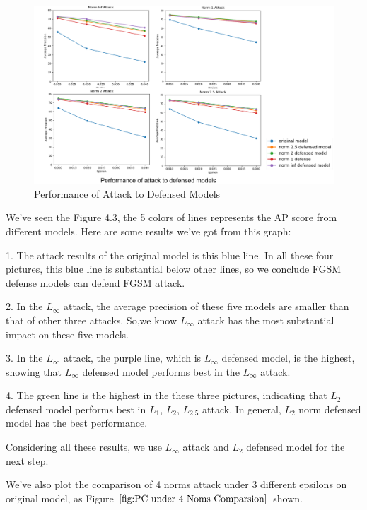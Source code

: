 \begin{figure}[!htbp]
\centering
\includegraphics[scale=0.6]{Graphics/Defense Models Attack.png}
\caption{Performance of Attack to Defensed Models}
\label{fig:Defensed Models}
\end{figure}

We've seen the Figure 4.3, the 5 colors of lines represents the AP score from different models. Here are some results we've got from this graph:

1. The attack results of the original model is this blue line. In all these four pictures, this blue line is substantial below other lines, so we conclude FGSM defense models can defend FGSM attack.

2. In the \(L_{\infty}\) attack, the average precision of these five models are smaller than that of other three attacks. So,we know \(L_{\infty}\) attack has the most substantial impact on these five models.

3. In the \(L_{\infty}\) attack, the purple line, which is \(L_{\infty}\) defensed model, is the highest, showing that \(L_{\infty}\) defensed model performs best in the \(L_{\infty}\) attack.

4. The green line is the highest in the these three pictures, indicating that \(L_{2}\) defensed model 
performs best in \(L_{1}\), \(L_{2}\), \(L_{2.5}\) attack. In general, \(L_{2}\) norm defensed model has the best performance.

Considering all these results, we use \(L_{\infty}\) attack and \(L_{2}\) defensed model for the 
next step.

We've also plot the comparison of 4 norms attack under 3 different epsilons on original model, as Figure \(\ref{fig:PC under 4 Noms Comparsion}\) shown. 

